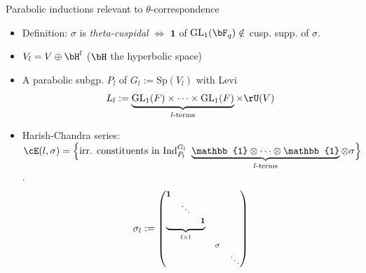\documentclass[t,mathserif,11pt,usenames,dvipsnames]{beamer}
\theoremstyle{plain}
\theoremstyle{definition}
\newcommand{\bfone}{\mathbf{1}}
\newcommand{\bbone}{\mathbb{1}}
\def\GL{\mathrm{GL}}
\def\Ind{{\rm Ind}}
\def\Sp{{\mathrm{Sp}}}
\def\blue{\color{blue}}
\let\oldemph\emph
\def\emph#1{\oldemph{\blue #1}}
\begin{document}
\begin{frame}{Parabolic inductions relevant to $\theta$-correspondence}
  \begin{itemize}
    \item[]\hspace{-3em} {\color{blue}Definition: }$\sigma$ is \emph{theta-cuspidal}
          $\Leftrightarrow$  $\bfone$ of $\GL_{1}(\bF_{q}) \notin $
          cusp. supp. of $\sigma$. \pause
    \item $V_l = V \oplus \bH^l$ ($\bH$ the hyperbolic space) %
    \item A parabolic subgp. $P_l$ of $G_{l}:=\Sp(V_l)$ with Levi \vspace{-.5em}
          \[
          L_l := \underbrace{\GL_1(F)\times \cdots \times \GL_1(F)}_{l\text{-terms}} \times \rU(V)
          \]
          \vspace{-1em}
          \pause
    \item Harish-Chandra series:
          $\cE(l,\sigma)=\Big\{\text{irr. constituents in }
           \Ind_{P_{l}}^{G_{l}}\  \underbrace{\bbone \otimes \cdots \otimes \bbone}_{l\text{-terms}} \otimes \sigma\Big\}$.
          \vspace{-.5em}\pause
          \[\footnotesize
          \sigma_{l} :=
          \begin{pmatrix}
            \underbrace{
            \begin{matrix}
              \bfone &     &  \\
                     & \ddots &\\
                     &     & \bfone \\
            \end{matrix}}_{l\times l} & \\
                     & \sigma &  \\
                     &   & \ddots  \\
          \end{pmatrix}
          \]
  \end{itemize}
\end{frame}
\end{document}
